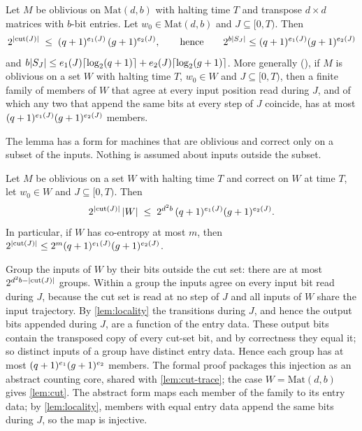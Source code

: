 \begin{lemma}\label{lem:cut}
Let $M$ be oblivious on $\mathrm{Mat}(d,b)$ with halting time $T$ and transpose $d\times d$
matrices with $b$-bit entries. Let $w_0\in\mathrm{Mat}(d,b)$ and $J\subseteq[0,T)$. Then
\[
  2^{\lvert \mathrm{cut}(J) \rvert}\;\le\;(q+1)^{e_1(J)}\,(g+1)^{e_2(J)},
  \qquad\text{hence}\qquad
  2^{b\lvert S_J \rvert}\le(q+1)^{e_1(J)}(g+1)^{e_2(J)}
\]
and $b\lvert S_J \rvert\le e_1(J)\lceil \log_2 (q+1) \rceil+e_2(J)\lceil \log_2 (g+1) \rceil$.
More generally (),
if $M$ is oblivious on a set $W$ with halting time $T$, $w_0\in W$ and $J\subseteq[0,T)$, then a finite
family of members of $W$ that agree at every input position read during $J$, and of which any two that
append the same bits at every step of $J$ coincide, has at most $(q+1)^{e_1(J)}(g+1)^{e_2(J)}$
members.
\end{lemma}

The lemma has a form for machines that are oblivious and correct only on a subset of the inputs.
Nothing is assumed about inputs outside the subset.

\begin{lemma}\label{lem:cut-on}
Let $M$ be oblivious on a set $W$ with halting time $T$ and correct on $W$ at time $T$, let
$w_0\in W$ and $J\subseteq[0,T)$. Then
\[
  2^{\lvert \mathrm{cut}(J) \rvert}\,\lvert W \rvert\;\le\;2^{d^2b}\,(q+1)^{e_1(J)}(g+1)^{e_2(J)} .
\]
In particular, if $W$ has co-entropy at most $m$, then
$2^{\lvert \mathrm{cut}(J) \rvert}\le 2^m(q+1)^{e_1(J)}(g+1)^{e_2(J)}$.
\end{lemma}

\begin{outline}
Group the inputs of $W$ by their bits outside the cut set: there are at most
$2^{d^2b-\lvert \mathrm{cut}(J) \rvert}$ groups. Within a group the inputs agree on every input bit read
during $J$, because the cut set is read at no step of $J$ and all inputs of $W$ share the input
trajectory. By \cref{lem:locality} the transitions during $J$, and hence the output bits appended
during $J$, are a function of the entry data. These output bits contain the transposed copy of
every cut-set bit, and by correctness they equal it; so distinct inputs of a group have distinct
entry data. Hence each group has at most $(q+1)^{e_1}(g+1)^{e_2}$ members. The formal proof packages this injection as an abstract counting core, shared with \cref{lem:cut-trace}; the case $W=\mathrm{Mat}(d,b)$ gives \cref{lem:cut}. The abstract form  maps each member of the family to its entry data; by \cref{lem:locality}, members with equal entry data append the same bits during $J$, so the map is injective.
\end{outline}

